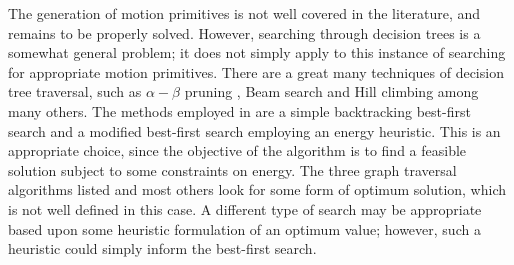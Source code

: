 The generation of motion primitives is not well covered in the literature, and remains to be properly solved. However, searching through decision trees is a somewhat general problem; it does not simply apply to this instance of searching for appropriate motion primitives. There are a great many techniques of decision tree traversal, such as $\alpha-\beta$ pruning \cite{knuth1976analysis}, Beam search \cite{steinbiss1994improvements} and Hill climbing \cite{goldfeld1966maximization} among many others. The methods employed in \cite{manchester13planning} are a simple backtracking best-first search and a modified best-first search employing an energy heuristic. This is an appropriate choice, since the objective of the algorithm is to find a feasible solution subject to some constraints on energy. The three graph traversal algorithms listed and most others look for some form of optimum solution, which is not well defined in this case. A different type of search may be appropriate based upon some heuristic formulation of an optimum value; however, such a heuristic could simply inform the best-first search.